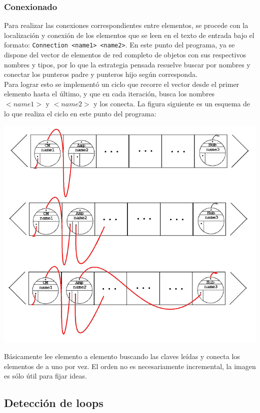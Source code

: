 \documentclass[10pt,a4paper]{article}
\begin{document}
\subsubsection{Conexionado}

Para realizar las conexiones correspondientes entre elementos, se procede con la localización y conexión de los elementos que se leen en el texto de entrada bajo el formato: \texttt{Connection <name1> <name2>}. En este punto del programa, ya se dispone del vector de elementos de red completo de objetos con sus respectivos nombres y tipos, por lo que la estrategia pensada resuelve buscar por nombres y conectar los punteros padre y punteros hijo según corresponda.\\

Para lograr esto se implementó un ciclo que recorre el vector desde el primer elemento hasta el último, y que en cada iteración, busca los nombres $<name1>$ y $<name2>$ y los conecta. La figura siguiente es un esquema de lo que realiza el ciclo en este punto del programa:\\
\begin{center}
\includegraphics[scale=0.25]{Images/vector_of_NetEls_connecting.png}
\end{center}
Básicamente lee elemento a elemento buscando las claves leídas y conecta los elementos de a uno por vez. El orden no es necesariamente incremental, la imagen es sólo útil para fijar ideas.

\subsection{Detección de loops}
\end{document}
